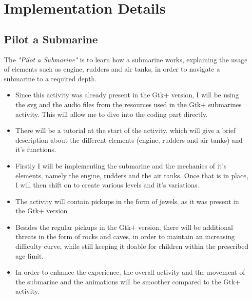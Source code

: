 \documentclass[preprint,12pt]{elsarticle}
\begin{document}
\section{Implementation Details}
\label{S:1}

\subsection{Pilot a Submarine}

The  \textit{"Pilot a Submarine"} is to learn how a submarine works, explaining the usage of elements such as engine, rudders and air tanks, in order to navigate a submarine to a required depth.

\begin{itemize}


\item Since this activity was already present in the Gtk+ version, I will be using the svg and the audio files from the resources used in the Gtk+ submarines activity. This will allow me to dive into the coding part directly. 

\item There will be a tutorial at the start of the activity, which will give a brief description about the different elements (engine, rudders and air tanks) and it's functions.

\item Firstly I will be implementing the submarine and the mechanics of it's elements, namely the engine, rudders and the air tanks. Once that is in place, I will then shift on to create various levels and it's variations.


\item The activity will contain pickups in the form of jewels, as it was present in the Gtk+ version

\item Besides the regular pickups in the Gtk+ version, there will be additional threats in the form of rocks and caves, in order to maintain an increasing difficulty curve, while still keeping it doable for children within the prescribed age limit.

\item In order to enhance the experience, the overall activity and the movement of the submarine and the animations will be smoother compared to the Gtk+ activity.


\end{itemize}
\end{document}

